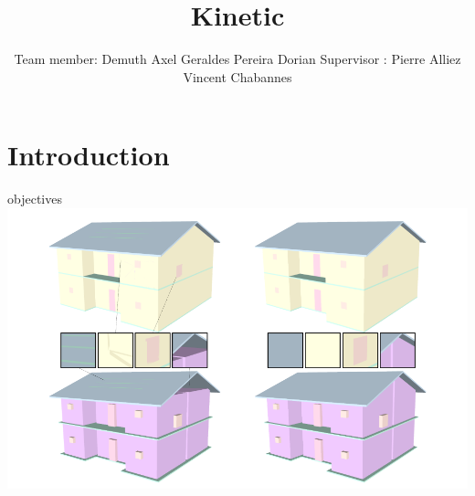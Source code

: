 \documentclass[10pt]{beamer}
\title{Kinetic}
\author{Team member: \newline\newline Demuth Axel \newline Geraldes Pereira Dorian \newline\newline Supervisor :  \newline\newline Pierre Alliez \newline Vincent Chabannes}
\date{}
\begin{document}
\frame{\titlepage}
\begin{frame}
    \tableofcontents
\end{frame}
\section{Introduction}


\begin{frame}[plain]{objectives}
    \includegraphics[scale = 0.45]{../../images/example_algorithm.png}
\end{frame}
\end{document}

